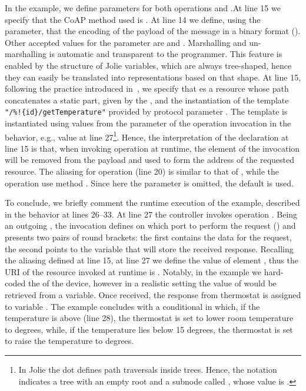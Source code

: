 In the example, we define  parameters for both operations
 and .\@ At line 15 we specify that the CoAP method used is . At
line 14 we define, using the  parameter, that the encoding of
the payload of the message in a binary format ().
Other accepted values for the
 parameter are  and . Marshalling and
un-marshalling is automatic and transparent to the programmer. This feature is
enabled by the structure of Jolie variables, which are always tree-shaped, hence
they can easily be translated into representations based on that shape. At line
15, following the practice introduced in~\cite{montesi16}, we specify that
 es a resource whose path concatenates a static part,
given by the , and the instantiation of the template
\lstinline|"/%!{id}/getTemperature"| provided by protocol parameter
. The template is instantiated using values from the parameter of
the operation invocation in the behavior, e.g., value  at line
27\footnote{In Jolie the dot  defines path traversals inside trees.
Hence, the notation  indicates a tree with an empty root and
a subnode called , whose value is .}. Hence, the
interpretation of the declaration at line 15 is that, when invoking operation
 at runtime, the element  of the invocation will be
removed from the payload and used to form the address of the requested resource.
The aliasing for operation  (line 20) is similar to that of
, while the operation use
method . Since here the  parameter is omitted, the
default  is used.

To conclude, we briefly comment the runtime execution of the example, described
in the behavior at lines 26--33. At line 27 the controller invokes operation
. Being an outgoing , the
invocation defines on which port to perform the request ()
and presents two pairs of round brackets: the first contains the data for the
request, the second points to the variable that will store the received
response. Recalling the aliasing defined at line 15, at line 27 we define the
value of element , thus the URI of the resource invoked at
runtime is . Notably, in the
example we hard-coded the  of the device, however in a realistic
setting the value of  would be retrieved from a variable. Once
received, the response from thermostat  is assigned to variable
. The example concludes with a conditional in which, if the
temperature is above  (line 28), the thermostat is set to lower room
temperature to  degrees, while, if the temperature lies below \code
{15} degrees, the thermostat is set to raise the temperature to 
degrees.

